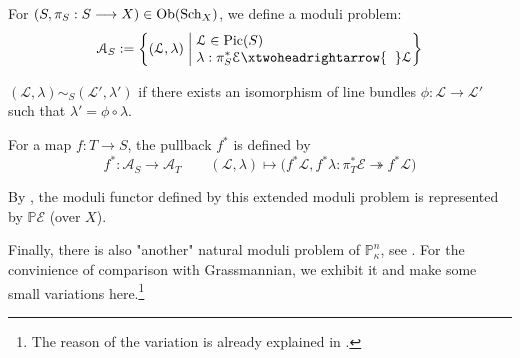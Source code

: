 \begin{eg}[{Projective bundle\footnote{There is an notational abuse in \cite{FOAG}. From my personal point of view, it's better to replace $\mathbb{P}\mathcal{E}$ with $\mathbb{P}\mathcal{E}^{\vee}$ or $\mathbb{P}V^{\vee}$ with $\mathbb{P}V$ to make symbols consistent. } $\mathbb{P}\mathcal{E}=\Proj(\Sym^{\bullet} \mathcal{E})$, see \cite[17.2.3]{FOAG}}]\hspace{1cm}

For $(S,\pi_S: S \longrightarrow X) \in \operatorname{Ob}(\operatorname{Sch}_{X})$, we define a moduli problem:
$$\mathcal{A}_S:=\left\{(\mathcal{L},\lambda)  \;\middle|\; \begin{aligned}
&\\[-5mm]
&\mathcal{L} \in \Pic(S)\\[-1mm]
& \lambda:\pi_S^* \mathcal{E} \xtwoheadrightarrow{\hspace{2mm}}  \mathcal{L}
\end{aligned}
 \right\}$$
 
   $(\mathcal{L},\lambda) \sim_S (\mathcal{L}',\lambda')$ if there exists an isomorphism of line bundles $\phi:\mathcal{L} \longrightarrow \mathcal{L}'$ such that $\lambda'=\phi \circ \lambda$.
   
   For a map $f:T \longrightarrow S$, the pullback $f^*$ is defined by
      $$f^*:\mathcal{A}_S \longrightarrow \mathcal{A}_T \qquad (\mathcal{L},\lambda) \longmapsto \big(f^*\mathcal{L},f^* \lambda:\pi_T^*\mathcal{E} \twoheadrightarrow f^*\mathcal{L}\big)$$
      
      By \cite[Proposition II.7.12]{hartshorne2013algebraic}, the moduli functor defined by this extended moduli problem is represented by $\mathbb{P}\mathcal{E}$ (over $X$).
\end{eg}

Finally, there is also "another" natural moduli problem of $\mathbb{P}_{\kappa}^n$, see \cite[Example 2.4]{modulicurve}. For the convinience of comparison with Grassmannian, we exhibit it and make some small variations here.\footnote{The reason of the variation is already explained in \cite[16.7, page 442]{FOAG}.}

